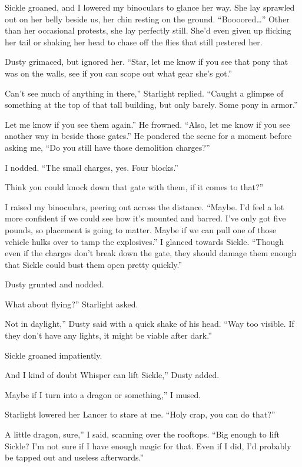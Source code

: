 Sickle groaned, and I lowered my binoculars to glance her way. She lay sprawled out on her belly beside us, her chin resting on the ground. “Boooored…” Other than her occasional protests, she lay perfectly still. She’d even given up flicking her tail or shaking her head to chase off the flies that still pestered her.

Dusty grimaced, but ignored her. “Star, let me know if you see that pony that was on the walls, see if you can scope out what gear she’s got.”

\leavevmode{}Can’t see much of anything in there,” Starlight replied. “Caught a glimpse of something at the top of that tall building, but only barely. Some pony in armor.”

\leavevmode{}Let me know if you see them again.” He frowned. “Also, let me know if you see another way in beside those gates.” He pondered the scene for a moment before asking me, “Do you still have those demolition charges?”

I nodded. “The small charges, yes. Four blocks.”

\leavevmode{}Think you could knock down that gate with them, if it comes to that?”

I raised my binoculars, peering out across the distance. “Maybe. I’d feel a lot more confident if we could see how it’s mounted and barred. I’ve only got five pounds, so placement is going to matter. Maybe if we can pull one of those vehicle hulks over to tamp the explosives.” I glanced towards Sickle. “Though even if the charges don’t break down the gate, they should damage them enough that Sickle could bust them open pretty quickly.”

Dusty grunted and nodded.

\leavevmode{}What about flying?” Starlight asked.

\leavevmode{}Not in daylight,” Dusty said with a quick shake of his head. “Way too visible. If they don’t have any lights, it might be viable after dark.”

Sickle groaned impatiently.

\leavevmode{}And I kind of doubt Whisper can lift Sickle,” Dusty added.

\leavevmode{}Maybe if I turn into a dragon or something,” I mused.

Starlight lowered her Lancer to stare at me. “Holy crap, you can do that?”

\leavevmode{}A little dragon, sure,” I said, scanning over the rooftops. “Big enough to lift Sickle? I’m not sure if I have enough magic for that. Even if I did, I’d probably be tapped out and useless afterwards.”

